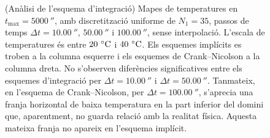 \begin{figure}[ht]
\begin{subfigure}{.5\textwidth}
		\label{fig:esquema_6}
	\end{subfigure}
	\caption{(Anàlisi de l'esquema d'integració) Mapes de temperatures en $t_\text{max} = 5000 \ \second$, amb discretització uniforme de $N_1 = 35$, passos de temps $\Delta t = 10.00 \ \second$, $50.00 \ \second$ i $100.00 \ \second$, sense interpolació. L'escala de temperatures és entre $20 \ \celsius$ i $40 \ \celsius$. Els esquemes implícits es troben a la columna esquerre i els esquemes de Crank--Nicolson a la columna dreta. No s'observen diferències significatives entre els esquemes d'integració per $\Delta t = 10.00 \ \second$ i $\Delta t = 50.00 \ \second$. Tanmateix, en l'esquema de Crank--Nicolson, per $\Delta t = 100.00 \ \second$, s'aprecia una franja horizontal de baixa temperatura en la part inferior del domini que, aparentment, no guarda relació amb la realitat física. Aquesta mateixa franja no apareix en l'esquema implícit.}	
	\label{fig:esquema_5000}
\end{figure} 

